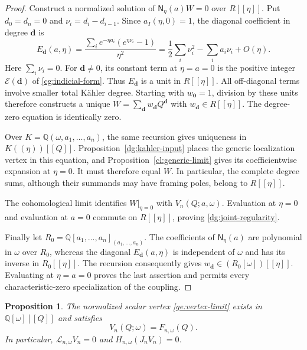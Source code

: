 \documentclass[11pt]{amsart}
\newtheorem{proposition}[theorem]{Proposition}
\theoremstyle{definition}
\theoremstyle{remark}
\numberwithin{equation}{section}
\newcommand{\Q}{\mathbb Q}
\begin{document}
\begin{proof}
Construct a normalized solution of $\mathsf N_\eta(a)W=0$
over $R[[\eta]]$. Put $d_0=d_n=0$ and
$\nu_i=d_i-d_{i-1}$. Since $a_I(\eta,0)=1$, the diagonal
coefficient in degree $\boldsymbol d$ is
\begin{equation}\label{dg:joint-recursion-diagonal}
 E_{\boldsymbol d}(a,\eta)
 =\frac{\sum_i e^{-\eta a_i}(e^{\eta\nu_i}-1)}{\eta^2}
 =\frac12\sum_i\nu_i^2-\sum_i a_i\nu_i+O(\eta).
\end{equation}
Here $\sum_i\nu_i=0$. For $\boldsymbol d\ne0$, its constant
term at $\eta=a=0$ is the positive integer
$\mathcal E(\boldsymbol d)$ of \eqref{cg:indicial-form}.
Thus $E_{\boldsymbol d}$ is a unit in $R[[\eta]]$.
All off-diagonal terms involve smaller total K\"ahler degree.
Starting with $w_{\boldsymbol0}=1$, division by these units
therefore constructs a unique
$W=\sum_{\boldsymbol d}w_{\boldsymbol d}Q^{\boldsymbol d}$ with
$w_{\boldsymbol d}\in R[[\eta]]$. The degree-zero equation is
identically zero.

Over $K=\Q(\omega,a_1,\ldots,a_n)$, the same recursion gives
uniqueness in $K((\eta))[[Q]]$.
Proposition~\ref{dg:kahler-input} places the generic localization
vertex in this equation, and Proposition~\ref{cl:generic-limit}
gives its coefficientwise expansion at $\eta=0$.
It must therefore equal $W$. In particular, the complete degree
sums, although their summands may have framing poles, belong to
$R[[\eta]]$.

The cohomological limit identifies $W|_{\eta=0}$ with
$V_n(Q;a,\omega)$. Evaluation at $\eta=0$ and evaluation at
$a=0$ commute on $R[[\eta]]$, proving
\eqref{dg:joint-regularity}.

Finally let
$R_0=\Q[a_1,\ldots,a_n]_{(a_1,\ldots,a_n)}$.
The coefficients of $\mathsf N_\eta(a)$ are polynomial in
$\omega$ over $R_0$, whereas the diagonal
$E_{\boldsymbol d}(a,\eta)$ is independent of $\omega$ and has
its inverse in $R_0[[\eta]]$.
The recursion consequently gives
$w_{\boldsymbol d}\in(R_0[\omega])[[\eta]]$.
Evaluating at $\eta=a=0$ proves the last assertion and permits
every characteristic-zero specialization of the coupling.
\end{proof}

\begin{proposition}\label{dg:vertex-equation}
The normalized scalar vertex \eqref{ge:vertex-limit} exists in
$\Q[\omega][[Q]]$ and satisfies
\begin{equation}\label{dg:vertex-period-identification}
 V_n(Q;\omega)=F_{n,\omega}(Q).
\end{equation}
In particular, $\mathcal L_{n,\omega}V_n=0$ and
$H_{n,\omega}(J_nV_n)=0$.
\end{proposition}
\end{document}
